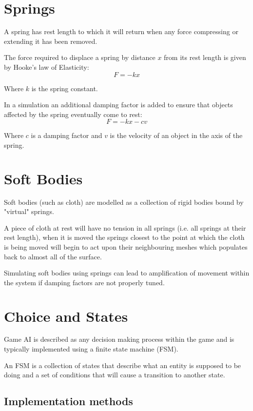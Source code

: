\documentclass[a4paper]{article}
\begin{document}
\section{Springs}
\label{sec:springs}

A spring has rest length to which it will return when any force compressing or
extending it has been removed.

The force required to displace a spring by distance $x$ from its rest length is
given by Hooke's law of Elasticity:
\[
  F = -kx
\]

Where $k$ is the spring constant.

In a simulation an additional damping factor is added to ensure that objects
affected by the spring eventually come to rest:
\[
  F = -kx - cv
\]

Where $c$ is a damping factor and $v$ is the velocity of an object in the axis
of the spring.

\section{Soft Bodies}
\label{sec:soft_bodies}

Soft bodies (such as cloth) are modelled as a collection of rigid bodies bound
by "virtual" springs.

A piece of cloth at rest will have no tension in all springs (i.e. all springs
at their rest length), when it is moved the springs closest to the point at
which the cloth is being moved will begin to act upon their neighbouring meshes
which populates back to almost all of the surface.

Simulating soft bodies using springs can lead to amplification of movement
within the system if damping factors are not properly tuned.

\section{Choice and States}
\label{sec:choice_and_states}

Game AI is described as any decision making process within the game and is
typically implemented using a finite state machine (FSM).

An FSM is a collection of states that describe what an entity is supposed to be
doing and a set of conditions that will cause a transition to another state.

\subsection{Implementation methods}
\end{document}
